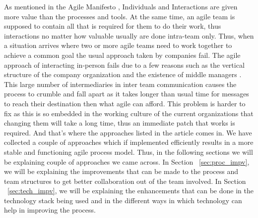 As mentioned in the Agile Manifesto \cite{beck2001agile}, Individuals and Interactions are given more value than the processes and tools. At the same time, an agile team is supposed to contain all that is required for them to do their work, thus interactions no matter how valuable usually are done intra-team only. Thus, when a situation arrives where two or more agile teams need to work together to achieve a common goal the usual approach taken by companies fail. The agile approach of interacting in-person fails due to a few reasons such as the vertical structure of the company organization and the existence of middle managers \cite{dzone_article}. This large number of intermediaries in inter team communication causes the process to crumble and fall apart as it takes longer than usual time for messages to reach their destination then what agile can afford.
This problem is harder to fix as this is so embedded in the working culture of the current organizations that changing them will take a long time, thus an immediate patch that works is required. And that’s where the approaches listed in the article comes in. We have collected a couple of approaches which if implemented efficiently results in a more stable and functioning agile process model. Thus, in the following sections we will be explaining couple of approaches we came across.
\linebreak
\linebreak
In Section ~\ref{sec:proc_impv}, we will be explaining the improvements that can be made to the process and team structures to get better collaboration out of the team involved.
\linebreak
\linebreak
In Section ~\ref{sec:tech_impv}, we will be explaining the enhancements that can be done in the technology stack being used and in the different ways in which technology can help in improving the process.

